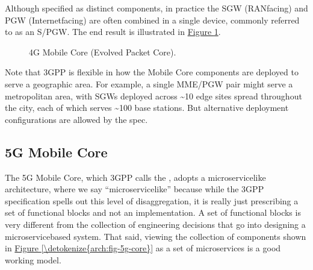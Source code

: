 \documentclass[a4paper,11pt,english]{sphinxmanual}
\let\sphinxpxdimen\pdfpxdimen\else\newdimen\sphinxpxdimen
\begin{document}
\sphinxAtStartPar
Although specified as distinct components, in practice the SGW
(RAN\sphinxhyphen{}facing) and PGW (Internet\sphinxhyphen{}facing) are often combined in a single
device, commonly referred to as an S/PGW. The end result is illustrated
in \hyperref[\detokenize{arch:fig-4g-core}]{Figure \ref{\detokenize{arch:fig-4g-core}}}.

\begin{figure}[ht]
\centering
\capstart

\noindent\sphinxincludegraphics[width=700\sphinxpxdimen]{{Slide20}.png}
\caption{4G Mobile Core (Evolved Packet Core).}\label{\detokenize{arch:id10}}\label{\detokenize{arch:fig-4g-core}}\end{figure}

\sphinxAtStartPar
Note that 3GPP is flexible in how the Mobile Core components are
deployed to serve a geographic area. For example, a single MME/PGW pair
might serve a metropolitan area, with SGWs deployed across \textasciitilde{}10 edge
sites spread throughout the city, each of which serves \textasciitilde{}100 base
stations. But alternative deployment configurations are allowed by the
spec.


\subsection{5G Mobile Core}
\label{\detokenize{arch:id1}}
\sphinxAtStartPar
The 5G Mobile Core, which 3GPP calls the , adopts a
microservice\sphinxhyphen{}like architecture, where we say “microservice\sphinxhyphen{}like” because
while the 3GPP specification spells out this level of disaggregation, it
is really just prescribing a set of functional blocks and not an
implementation. A set of functional blocks is very
different from the collection of engineering decisions that go into
designing a microservice\sphinxhyphen{}based system. That said, viewing the collection of
components shown in \hyperref[\detokenize{arch:fig-5g-core}]{Figure \ref{\detokenize{arch:fig-5g-core}}}
as a set of microservices is a good working model.
\end{document}
